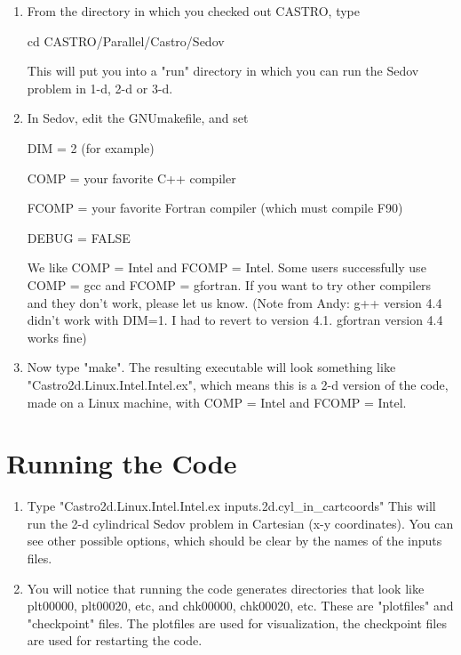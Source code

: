 \begin{enumerate}

\item From the directory in which you checked out CASTRO, type

cd CASTRO/Parallel/Castro/Sedov

This will put you into a "run" directory in which you can run the Sedov problem in 1-d, 2-d or 3-d.
\item In Sedov, edit the GNUmakefile, and set

DIM = 2 (for example)

COMP = your favorite C++ compiler

FCOMP = your favorite Fortran compiler (which must compile F90)

DEBUG = FALSE

We like COMP = Intel and FCOMP = Intel. Some users successfully use 
COMP = gcc and FCOMP = gfortran. If you want to try other compilers and they don't work, 
please let us know.  (Note from Andy: g++ version 4.4 didn't work with DIM=1.  I had to revert to version 4.1.  gfortran version 4.4 works fine)

\item Now type "make". The resulting executable will look something like 
"Castro2d.Linux.Intel.Intel.ex", which means this is a 2-d version of the code, 
made on a Linux machine, with COMP = Intel and FCOMP = Intel.

\end{enumerate}

\section{Running the Code}

\begin{enumerate}

\item Type "Castro2d.Linux.Intel.Intel.ex inputs.2d.cyl\_in\_cartcoords" 
This will run the 2-d cylindrical Sedov problem in Cartesian (x-y coordinates). 
You can see other possible options, which should be clear by the names of the inputs files.

\item You will notice that running the code generates directories that look like 
plt00000, plt00020, etc, and chk00000, chk00020, etc. These are "plotfiles" and 
"checkpoint" files. The plotfiles are used for visualization, the checkpoint files are 
used for restarting the code.

\end{enumerate}

